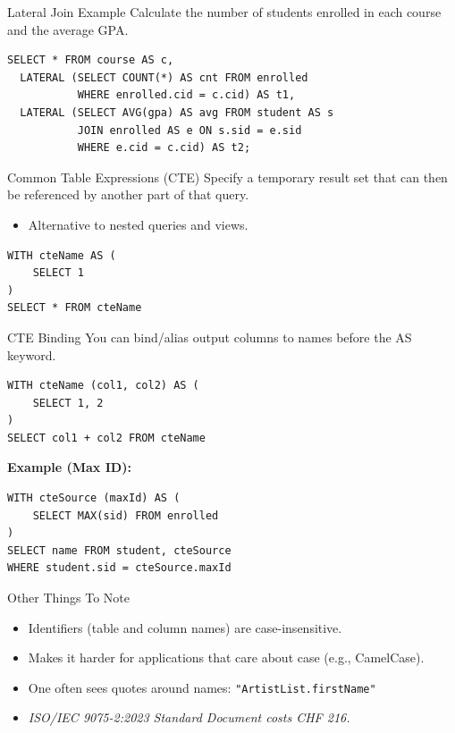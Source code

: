 \documentclass[aspectratio=169]{beamer}
\begin{document}
\begin{frame}[fragile]{Lateral Join Example}
    Calculate the number of students enrolled in each course and the average GPA.
    
    \begin{lstlisting}
SELECT * FROM course AS c,
  LATERAL (SELECT COUNT(*) AS cnt FROM enrolled
           WHERE enrolled.cid = c.cid) AS t1,
  LATERAL (SELECT AVG(gpa) AS avg FROM student AS s
           JOIN enrolled AS e ON s.sid = e.sid
           WHERE e.cid = c.cid) AS t2;
    \end{lstlisting}
\end{frame}

\begin{frame}[fragile]{Common Table Expressions (CTE)}
    Specify a temporary result set that can then be referenced by another part of that query.
    \begin{itemize}
        \item Alternative to nested queries and views.
    \end{itemize}
    
    \begin{lstlisting}
WITH cteName AS (
    SELECT 1
)
SELECT * FROM cteName
    \end{lstlisting}
\end{frame}

\begin{frame}[fragile]{CTE Binding}
    You can bind/alias output columns to names before the AS keyword.
    
    \begin{lstlisting}
WITH cteName (col1, col2) AS (
    SELECT 1, 2
)
SELECT col1 + col2 FROM cteName
    \end{lstlisting}
    
    \textbf{Example (Max ID):}
    \begin{lstlisting}
WITH cteSource (maxId) AS (
    SELECT MAX(sid) FROM enrolled
)
SELECT name FROM student, cteSource
WHERE student.sid = cteSource.maxId
    \end{lstlisting}
\end{frame}

\begin{frame}{Other Things To Note}
    \begin{itemize}
        \item Identifiers (table and column names) are case-insensitive.
        \item Makes it harder for applications that care about case (e.g., CamelCase).
        \item One often sees quotes around names: \texttt{"ArtistList.firstName"}
        \item \textit{ISO/IEC 9075-2:2023 Standard Document costs CHF 216.}
    \end{itemize}
\end{frame}
\end{document}
